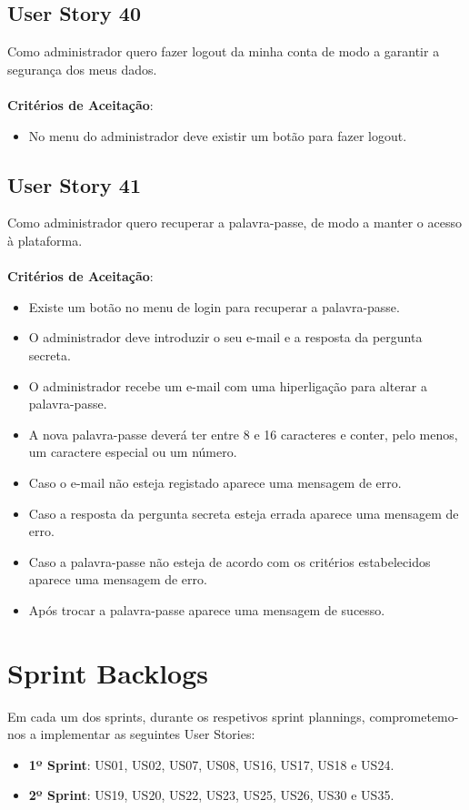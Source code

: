 \documentclass[a4paper,11pt]{article}
\begin{document}
\subsection{User Story 40}
Como administrador quero fazer logout da minha conta de modo a garantir a segurança dos meus dados.\\\\
\textbf{Critérios de Aceitação}:
\begin{itemize}
  \item No menu do administrador deve existir um botão para fazer logout.
\end{itemize}
\subsection{User Story 41}
Como administrador quero recuperar a palavra-passe, de modo a manter o acesso à plataforma.\\\\
\textbf{Critérios de Aceitação}:
\begin{itemize}
  \item Existe um botão no menu de login para recuperar a palavra-passe.
  \item O administrador deve introduzir o seu e-mail e a resposta da pergunta secreta.
  \item O administrador recebe um e-mail com uma hiperligação para alterar a palavra-passe.
  \item A nova palavra-passe deverá ter entre 8 e 16 caracteres e conter, pelo menos, um caractere especial ou um número.
  \item Caso o e-mail não esteja registado aparece uma mensagem de erro.
  \item Caso a resposta da pergunta secreta esteja errada aparece uma mensagem de erro.
  \item Caso a palavra-passe não esteja de acordo com os critérios estabelecidos aparece uma mensagem de erro.
  \item Após trocar a palavra-passe aparece uma mensagem de sucesso.
\end{itemize}

\vspace{30pt}
\section{Sprint Backlogs}
Em cada um dos sprints, durante os respetivos sprint plannings, comprometemo-nos a implementar as seguintes User Stories:
\begin{itemize}
  \item \textbf{1º Sprint}: US01, US02, US07, US08, US16, US17, US18 e US24.
  \item \textbf{2º Sprint}: US19, US20, US22, US23, US25, US26, US30 e US35.
\end{itemize}
  
\end{document}
